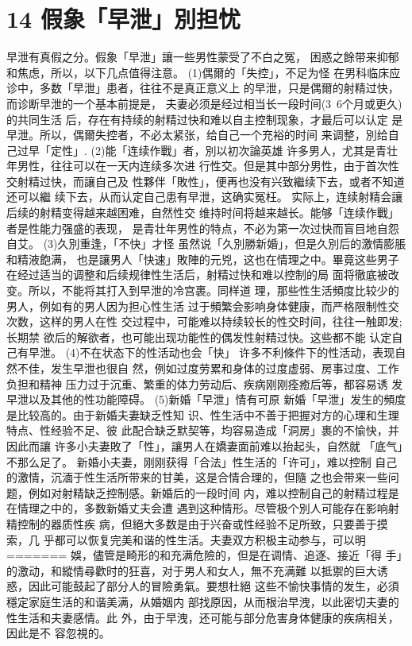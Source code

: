 \documentclass[12pt,UTF8]{ctexbook}
\begin{document}
\section{14 假象「早泄」別担忧}

早泄有真假之分。假象「早泄」讓一些男性蒙受了不白之冤，
困惑之餘带来抑郁和焦虑，所以，以下几点值得注意。
(1)偶爾的「失控」，不足为怪
在男科临床应诊中，多数「早泄」患者，往往不是真正意义上
的早泄，只是偶爾的射精过快，而诊断早泄的一个基本前提是，
夫妻必须是经过相当长一段时间(3~6个月或更久)的共同生活
后，存在有持续的射精过快和难以自主控制现象，才最后可以认定
是早泄。所以，偶爾失控者，不必太紧张，给自己一个充裕的时间
来调整，別给自己过早「定性」.
(2)能「连续作戰」者，別以初次論英雄
许多男人，尤其是青壮年男性，往往可以在一天内连续多次进
行性交。但是其中部分男性，由于首次性交射精过快，而讓自己及
性夥伴「敗性」，便再也没有兴致繼续下去，或者不知道还可以繼
续下去，从而认定自己患有早泄，这确实冤枉。
实际上，连续射精会讓后续的射精变得越来越困难，自然性交
维持时间将越来越长。能够「连续作戰」者是性能力强盛的表现，
是青壮年男性的特点，不必为第一次过快而盲目地自怨自艾。
(3)久別重逢，「不快」才怪
虽然说「久別勝新婚」，但是久別后的激情膨脹和精液飽满，
也是讓男人「快速」敗陣的元兇，这也在情理之中。畢竟这些男子
在经过适当的调整和后续规律性生活后，射精过快和难以控制的局
面将徹底被改变。所以，不能将其打入到早泄的冷宫裹。同样道
理，那些性生活頻度比较少的男人，例如有的男人因为担心性生活
过于頻繁会影响身体健康，而严格限制性交次数，这样的男人在性
交过程中，可能难以持续较长的性交时间，往往一触即发;长期禁
欲后的解欲者，也可能出现功能性的偶发性射精过快。这些都不能
认定自己有早泄。
(4)不在状态下的性活动也会「快」
许多不利條件下的性活动，表现自然不佳，发生早泄也很自
然，例如过度劳累和身体的过度虚弱、房事过度、工作负担和精神
压力过于沉重、繁重的体力劳动后、疾病刚刚痊癒后等，都容易诱
发早泄以及其他的性功能障碍。
(5)新婚「早泄」情有可原
新婚「早泄」发生的頻度是比较高的。由于新婚夫妻缺乏性知
识、性生活中不善于把握对方的心理和生理特点、性经验不足、彼
此配合缺乏默契等，均容易造成「洞房」裹的不愉快，并因此而讓
许多小夫妻敗了「性」，讓男人在嬌妻面前难以抬起头，自然就
「底气」不那么足了。
新婚小夫妻，刚刚获得「合法」性生活的「许可」，难以控制
自己的激情，沉湎于性生活所带来的甘美，这是合情合理的，但隨
之也会带来一些问题，例如对射精缺乏控制感。新婚后的一段时间
内，难以控制自己的射精过程是在情理之中的，多数新婚丈夫会遭
遇到这种情形。尽管极个別人可能存在影响射精控制的器质性疾
病，但絕大多数是由于兴奋或性经验不足所致，只要善于摸索，几
乎都可以恢复完美和谐的性生活。夫妻双方积极主动参与，可以明
=======
娛，儘管是畸形的和充满危險的，但是在调情、追逐、接近「得
手」的激动，和縱情尋歡时的狂喜，对于男人和女人，無不充满難
以抵禦的巨大诱惑，因此可能鼓起了部分人的冒險勇氣。要想杜絕
这些不愉快事情的发生，必須穩定家庭生活的和谐美满，从婚姻内
部找原因，从而根治早洩，以此密切夫妻的性生活和夫妻感情。此
外，由于早洩，还可能与部分危害身体健康的疾病相关，因此是不
容忽視的。
\end{document}
